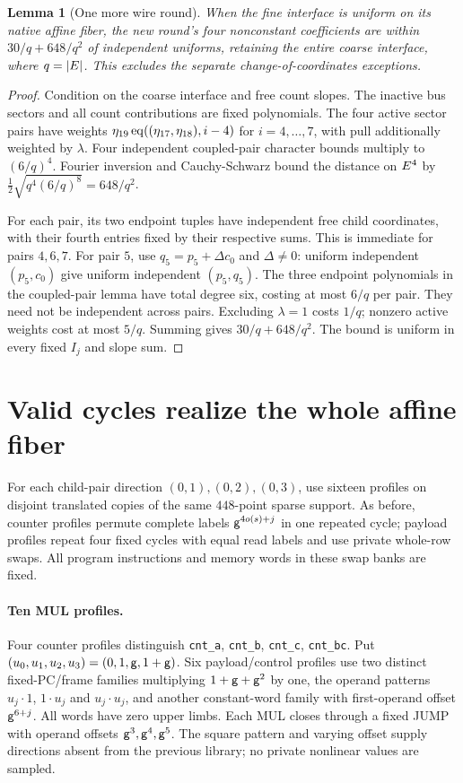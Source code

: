 \documentclass[11pt]{article}
\newtheorem{lemma}{Lemma}
\begin{document}
\begin{lemma}[One more wire round]
When the fine interface is uniform on its native affine fiber, the new round's four nonconstant coefficients are within $30/q+648/q^2$ of independent uniforms, retaining the entire coarse interface, where $q=|E|$. This excludes the separate change-of-coordinates exceptions.
\end{lemma}
\begin{proof}
Condition on the coarse interface and free count slopes. The inactive bus sectors and all count contributions are fixed polynomials. The four active sector pairs have weights $\eta_{19}\operatorname{eq}((\eta_{17},\eta_{18}),i-4)$ for $i=4,\ldots,7$, with pull additionally weighted by $\lambda$. Four independent coupled-pair character bounds multiply to $(6/q)^4$. Fourier inversion and Cauchy-Schwarz bound the distance on $E^4$ by $\tfrac12\sqrt{q^4(6/q)^8}=648/q^2$.

For each pair, its two endpoint tuples have independent free child coordinates, with their fourth entries fixed by their respective sums. This is immediate for pairs $4,6,7$. For pair $5$, use $q_5=p_5+\Delta c_0$ and $\Delta\ne0$: uniform independent $(p_5,c_0)$ give uniform independent $(p_5,q_5)$. The three endpoint polynomials in the coupled-pair lemma have total degree six, costing at most $6/q$ per pair. They need not be independent across pairs. Excluding $\lambda=1$ costs $1/q$; nonzero active weights cost at most $5/q$. Summing gives $30/q+648/q^2$. The bound is uniform in every fixed $I_j$ and slope sum.
\end{proof}

\section{Valid cycles realize the whole affine fiber}

For each child-pair direction $(0,1),(0,2),(0,3)$, use sixteen profiles on disjoint translated copies of the same $448$-point sparse support. As before, counter profiles permute complete labels $\mathsf{g}^{4o(s)+j}$ in one repeated cycle; payload profiles repeat four fixed cycles with equal read labels and use private whole-row swaps. All program instructions and memory words in these swap banks are fixed.

\paragraph{Ten MUL profiles.} Four counter profiles distinguish \texttt{cnt\_a}, \texttt{cnt\_b}, \texttt{cnt\_c}, \texttt{cnt\_bc}. Put $(u_0,u_1,u_2,u_3)=(0,1,\mathsf{g},1+\mathsf{g})$. Six payload/control profiles use two distinct fixed-PC/frame families multiplying $1+\mathsf{g}+\mathsf{g}^2$ by one, the operand patterns $u_j\cdot1$, $1\cdot u_j$ and $u_j\cdot u_j$, and another constant-word family with first-operand offset $\mathsf{g}^{6+j}$. All words have zero upper limbs. Each MUL closes through a fixed JUMP with operand offsets $\mathsf{g}^3,\mathsf{g}^4,\mathsf{g}^5$. The square pattern and varying offset supply directions absent from the previous library; no private nonlinear values are sampled.
\end{document}
